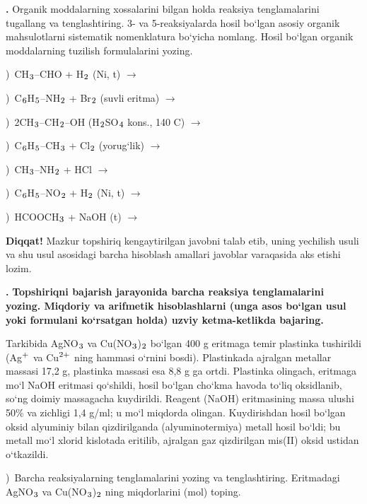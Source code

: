 \documentclass[11pt,a4paper]{article}
\renewcommand{\textsubscript}[1]{\ensuremath{_{\text{\fontsize{8}{8}\selectfont #1}}}}
\renewcommand{\textsuperscript}[1]{\ensuremath{^{\text{\fontsize{8}{8}\selectfont #1}}}}
\newcommand{\qn}[1]{\textbf{\fontsize{11.5}{13}\selectfont #1}}
\newcommand{\qsep}{\par\vspace{13pt}}
\newcommand{\diqqat}[1]{\par\smallskip\noindent\textbf{Diqqat!} #1\par\medskip}
\begin{document}
\noindent\qn{42.} Organik moddalarning xossalarini bilgan holda reaksiya tenglamalarini tugallang va tenglashtiring. 3- va 5-reaksiyalarda hosil bo`lgan asosiy organik mahsulotlarni sistematik nomenklatura bo`yicha nomlang. Hosil bo`lgan organik moddalarning tuzilish formulalarini yozing.\par
{})\ CH\textsubscript{3}--CHO + H\textsubscript{2} (Ni, t) $\to$\par
{})\ C\textsubscript{6}H\textsubscript{5}--NH\textsubscript{2} + Br\textsubscript{2} (suvli eritma) $\to$\par
{})\ 2CH\textsubscript{3}--CH\textsubscript{2}--OH (H\textsubscript{2}SO\textsubscript{4} kons., 140 \textdegree{}C) $\to$\par
{})\ C\textsubscript{6}H\textsubscript{5}--CH\textsubscript{3} + Cl\textsubscript{2} (yorug`lik) $\to$\par
{})\ CH\textsubscript{3}--NH\textsubscript{2} + HCl $\to$\par
{})\ C\textsubscript{6}H\textsubscript{5}--NO\textsubscript{2} + H\textsubscript{2} (Ni, t) $\to$\par
{})\ HCOOCH\textsubscript{3} + NaOH (t) $\to$\par
\diqqat{Mazkur topshiriq kengaytirilgan javobni talab etib, uning yechilish usuli va shu usul asosidagi barcha hisoblash amallari javoblar varaqasida aks etishi lozim.}\qsep
\noindent\qn{43.} \textbf{Topshiriqni bajarish jarayonida barcha reaksiya tenglamalarini yozing. Miqdoriy va arifmetik hisoblashlarni (unga asos bo`lgan usul yoki formulani ko`rsatgan holda) uzviy ketma-ketlikda bajaring.}\par\smallskip
Tarkibida AgNO\textsubscript{3} va Cu(NO\textsubscript{3})\textsubscript{2} bo`lgan 400 g eritmaga temir plastinka tushirildi (Ag\textsuperscript{+} va Cu\textsuperscript{2+} ning hammasi o`rnini bosdi). Plastinkada ajralgan metallar massasi 17,2 g, plastinka massasi esa 8,8 g ga ortdi. Plastinka olingach, eritmaga mo`l NaOH eritmasi qo`shildi, hosil bo`lgan cho`kma havoda to`liq oksidlanib, so`ng doimiy massagacha kuydirildi. Reagent (NaOH) eritmasining massa ulushi 50\% va zichligi 1,4 g/ml; u mo`l miqdorda olingan. Kuydirishdan hosil bo`lgan oksid alyuminiy bilan qizdirilganda (alyuminotermiya) metall hosil bo`ldi; bu metall mo`l xlorid kislotada eritilib, ajralgan gaz qizdirilgan mis(II) oksid ustidan o`tkazildi.\par
{})\ Barcha reaksiyalarning tenglamalarini yozing va tenglashtiring. Eritmadagi AgNO\textsubscript{3} va Cu(NO\textsubscript{3})\textsubscript{2} ning miqdorlarini (mol) toping.\par
\end{document}
